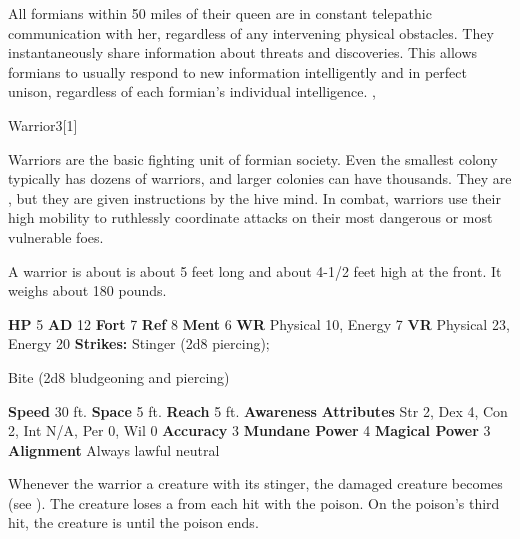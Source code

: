         All formians within 50 miles of their queen are in constant telepathic communication with her, regardless of any intervening physical obstacles.
        They instantaneously share information about threats and discoveries.
        This allows formians to usually respond to new information intelligently and in perfect unison, regardless of each formian's individual intelligence.
  ,
  \begin{monsubsection}{Warrior}{3}[1]
    \vspace{-1em}\vspace{-1em}
    \vspace{0em}

    
        Warriors are the basic fighting unit of formian society.
        Even the smallest colony typically has dozens of warriors, and larger colonies can have thousands.
        They are , but they are given instructions by the hive mind.
        In combat, warriors use their high mobility to ruthlessly coordinate attacks on their most dangerous or most vulnerable foes.

        A warrior is about is about 5 feet long and about 4-1/2 feet high at the front.
        It weighs about 180 pounds.
      
    

    \begin{spellcontent}
      \begin{spelltargetinginfo}
        \pari \textbf{HP} 5 \monsep
          \textbf{AD} 12 \monsep
          \textbf{Fort} 7 \monsep
          \textbf{Ref} 8 \monsep
          \textbf{Ment} 6
        \pari \textbf{WR} Physical 10, Energy 7 \monsep
        \textbf{VR} Physical 23, Energy 20
        \pari \textbf{Strikes:}
            Stinger  (2d8 piercing);
\par Bite  (2d8 bludgeoning and piercing)
      \end{spelltargetinginfo}
    \end{spellcontent}
    \begin{monsterfooter}
      \pari \textbf{Speed} 30 ft. \monsep
        \textbf{Space} 5 ft. \monsep
        \textbf{Reach} 5 ft.
      \pari \textbf{Awareness} 
      \pari \textbf{Attributes}
        Str 2, Dex 4,
        Con 2, Int N/A,
        Per 0, Wil 0
      \pari \textbf{Accuracy} 3 \monsep
        \textbf{Mundane Power} 4 \monsep
      \textbf{Magical Power} 3
      \pari \textbf{Alignment} Always lawful neutral
    \end{monsterfooter}
  \end{monsubsection}
            Whenever the warrior  a creature with its stinger, the damaged creature becomes  (see ).
            The creature loses a  from each hit with the poison.
            On the poison's third hit, the creature is  until the poison ends.
  
